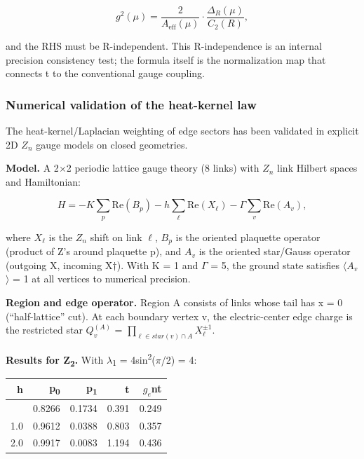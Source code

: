 \documentclass[11pt,a4paper]{article}
\theoremstyle{remark}
\begin{document}
\[
g^2(\mu) = \frac{2}{A_\mathrm{eff}(\mu)} \cdot \frac{\Delta_R(\mu)}{C_2(R)},
\]

and the RHS must be R-independent. This R-independence is an internal
precision consistency test; the formula itself is the normalization map that
connects t to the conventional gauge coupling.

\subsubsection{Numerical validation of the heat-kernel law}\label{numerical-validation-of-the-heat-kernel-law}

The heat-kernel/Laplacian weighting of edge sectors has been validated in
explicit 2D \(Z_n\) gauge models on closed geometries.

\textbf{Model.} A 2\ensuremath{\times}2 periodic lattice gauge theory (8 links) with
\(Z_n\) link Hilbert spaces and Hamiltonian:

\[
H = -K \sum_p \mathrm{Re}(B_p) - h \sum_\ell \mathrm{Re}(X_\ell) - \Gamma \sum_v \mathrm{Re}(A_v),
\]

where \(X_\ensuremath{\ell}\) is the \(Z_n\) shift on link \ensuremath{\ell}, \(B_p\) is the oriented
plaquette operator (product of Z's around plaquette p), and \(A_v\) is the
oriented star/Gauss operator (outgoing X, incoming X\ensuremath{\dagger}). With
K = 1 and \ensuremath{\Gamma} = 5, the ground state satisfies \ensuremath{\langle}\(A_v\)\ensuremath{\rangle} = 1
at all vertices to numerical precision.

\textbf{Region and edge operator.} Region A consists of links whose tail has
x = 0 (``half-lattice'' cut). At each boundary vertex v, the electric-center
edge charge is the restricted star \(Q_v^{(A)}\) = \(\ensuremath{\prod}_{\ensuremath{\ell} \ensuremath{\in} star(v) \ensuremath{\cap} A} X_\ensuremath{\ell}^{\ensuremath{\pm}1}\).

\textbf{Results for Z\textsubscript{2}.} With \ensuremath{\lambda}\textsubscript{1} = 4sin\textsuperscript{2}(\ensuremath{\pi}/2) = 4:

{\def\LTcaptype{none} %
\begin{longtable}[]{@{}rrrrr@{}}
\toprule\noalign{}
h & p\textsubscript{0} & p\textsubscript{1} & t & \(g_e\)nt \\
\midrule\noalign{}
\endhead
\bottomrule\noalign{}
\endlastfoot
0.5 & 0.8266 & 0.1734 & 0.391 & 0.249 \\
1.0 & 0.9612 & 0.0388 & 0.803 & 0.357 \\
2.0 & 0.9917 & 0.0083 & 1.194 & 0.436 \\
\end{longtable}
}
\end{document}
